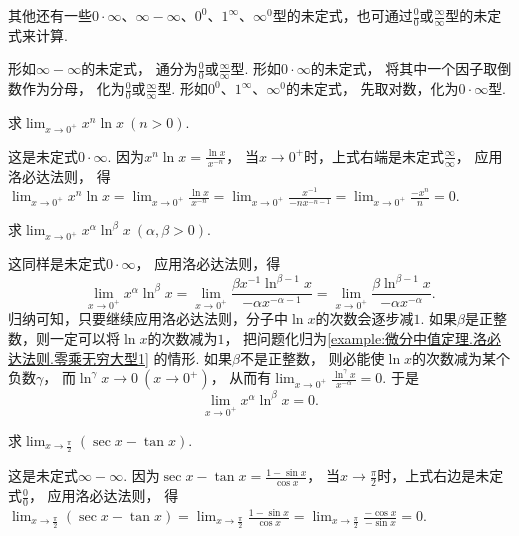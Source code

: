 其他还有一些\(0 \cdot \infty\)、\(\infty - \infty\)、\(0^0\)、\(1^\infty\)、\(\infty^0\)型的未定式，也可通过\(\frac{0}{0}\)或\(\frac{\infty}{\infty}\)型的未定式来计算.

形如\(\infty - \infty\)的未定式，
通分为\(\frac{0}{0}\)或\(\frac{\infty}{\infty}\)型.
形如\(0 \cdot \infty\)的未定式，
将其中一个因子取倒数作为分母，
化为\(\frac{0}{0}\)或\(\frac{\infty}{\infty}\)型.
形如\(0^0\)、\(1^\infty\)、\(\infty^0\)的未定式，
先取对数，化为\(0 \cdot \infty\)型.

\begin{example}\label{example:微分中值定理.洛必达法则.零乘无穷大型1}
求\(\lim_{x\to0^+} x^n \ln x\ (n > 0)\).
\begin{solution}
这是未定式\(0\cdot\infty\).
因为\(x^n \ln x = \frac{\ln x}{x^{-n}}\)，
当\(x\to0^+\)时，上式右端是未定式\(\frac{\infty}{\infty}\)，
应用洛必达法则，
得\(\lim_{x\to0^+} x^n \ln x
= \lim_{x\to0^+} \frac{\ln x}{x^{-n}}
= \lim_{x\to0^+} \frac{x^{-1}}{-nx^{-n-1}}
= \lim_{x\to0^+} \frac{-x^n}{n}
= 0\).
\end{solution}
\end{example}
\begin{example}\label{example:微分中值定理.洛必达法则.零乘无穷大型2}
求\(\lim_{x\to0^+} x^\alpha \ln^\beta x\ (\alpha,\beta>0)\).
\begin{solution}
这同样是未定式\(0\cdot\infty\)，
应用洛必达法则，得\[
	\lim_{x\to0^+} x^\alpha \ln^\beta x
	= \lim_{x\to0^+} \frac{\beta x^{-1} \ln^{\beta-1} x}{-\alpha x^{-\alpha-1}}
	= \lim_{x\to0^+} \frac{\beta \ln^{\beta-1} x}{-\alpha x^{-\alpha}}.
\]
归纳可知，只要继续应用洛必达法则，分子中\(\ln x\)的次数会逐步减\(1\).
如果\(\beta\)是正整数，则一定可以将\(\ln x\)的次数减为\(1\)，
把问题化归为\cref{example:微分中值定理.洛必达法则.零乘无穷大型1} 的情形.
如果\(\beta\)不是正整数，
则必能使\(\ln x\)的次数减为某个负数\(\gamma\)，
而\(\ln^\gamma x \to 0\ (x\to0^+)\)，
从而有\(\lim_{x\to0^+} \frac{\ln^\gamma x}{x^{-\alpha}} = 0\).
于是\[
	\lim_{x\to0^+} x^\alpha \ln^\beta x = 0.
\]
\end{solution}
\end{example}

\begin{example}
求\(\lim_{x\to\frac\pi2} (\sec x-\tan x)\).
\begin{solution}
这是未定式\(\infty-\infty\).
因为\(\sec x-\tan x = \frac{1-\sin x}{\cos x}\)，
当\(x\to\frac\pi2\)时，上式右边是未定式\(\frac00\)，
应用洛必达法则，
得\(\lim_{x\to\frac\pi2} (\sec x-\tan x)
= \lim_{x\to\frac\pi2} \frac{1-\sin x}{\cos x}
= \lim_{x\to\frac\pi2} \frac{-\cos x}{-\sin x}
= 0\).
\end{solution}
\end{example}

